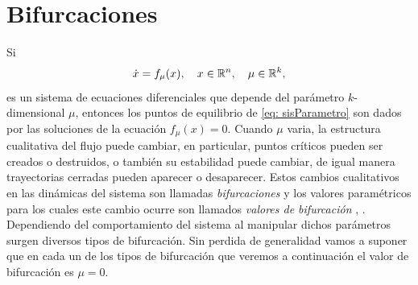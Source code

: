 %
%
%

\section{Bifurcaciones}

Si
\begin{equation}
	\dot{x} = f_{\mu}(x), \quad x \in {\mathbb{R}}^{n}, \quad \mu \in {\mathbb{R}}^{k},
	\label{eq: sisParametro}
\end{equation}
es un sistema de ecuaciones diferenciales que depende del parámetro $k$-dimensional $\mu$, entonces los puntos de equilibrio de \eqref{eq: sisParametro} son dados por las soluciones de la ecuación $f_{\mu}(x) = 0$. Cuando $\mu$ varia, la estructura cualitativa del flujo puede cambiar, en particular, puntos críticos pueden ser creados o destruidos, o también su estabilidad puede cambiar, de igual manera trayectorias cerradas pueden aparecer o desaparecer. Estos cambios cualitativos en las dinámicas del sistema son llamadas \textit{bifurcaciones} y los valores paramétricos para los cuales este cambio ocurre son llamados \textit{valores de bifurcación} \cite[p. 118]{guckenheimer1983}, \cite[Caps. 3 y 8]{strogatz2014}. Dependiendo del comportamiento del sistema al manipular dichos parámetros surgen diversos tipos de bifurcación. Sin perdida de generalidad vamos a suponer que en cada un de los tipos de bifurcación que veremos a continuación el valor de bifurcación es $\mu=0$.

